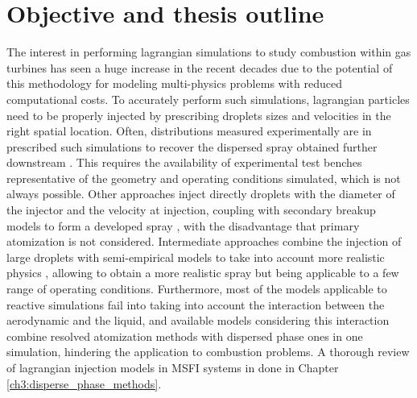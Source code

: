 \section{Objective and thesis outline}
\label{sec:ch1_objective_thesis_outline}

The interest in performing lagrangian simulations to study combustion within gas turbines has seen a huge increase in the recent decades due to the potential of this methodology for modeling multi-physics problems with reduced computational costs. To accurately perform such simulations, lagrangian particles need to be properly injected by prescribing droplets sizes and velocities in the right spatial location. Often, distributions measured experimentally are in prescribed such simulations to recover the dispersed spray obtained further downstream . This requires the availability of experimental test benches representative of the geometry and operating conditions simulated, which is not always possible. Other approaches inject directly droplets with the diameter of the injector and the velocity at injection, coupling with secondary breakup models to form a developed spray , with the disadvantage that primary atomization is not considered. Intermediate approaches combine the injection of large droplets with semi-empirical models to take into account more realistic physics , allowing to obtain a more realistic spray but being applicable to a few range of operating conditions. Furthermore, most of the models applicable to reactive simulations fail into taking into account the interaction between the aerodynamic and the liquid, and available models considering this interaction  combine resolved atomization methods with dispersed phase ones in one simulation, hindering the application to combustion problems. A thorough review of lagrangian injection models in MSFI systems in done in Chapter \ref{ch3:disperse_phase_methods}.

